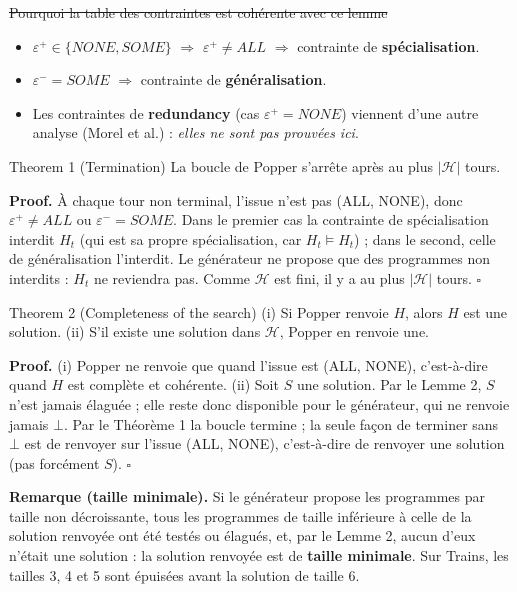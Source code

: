 \documentclass[10pt]{article}
\begin{document}
\st{Pourquoi la table des contraintes est cohérente avec ce lemme}
\begin{itemize}
  \item $\varepsilon^+\in\{\mathit{NONE},\mathit{SOME}\}$ $\Rightarrow$ $\varepsilon^+\neq\mathit{ALL}$ $\Rightarrow$ contrainte de \textbf{spécialisation}.
  \item $\varepsilon^-=\mathit{SOME}$ $\Rightarrow$ contrainte de \textbf{généralisation}.
  \item Les contraintes de \textbf{redundancy} (cas $\varepsilon^+=\mathit{NONE}$) viennent d'une autre analyse (Morel et al.) : \emph{elles ne sont pas prouvées ici}.
\end{itemize}

\begin{enonce}{Theorem 1 (Termination)}
La boucle de Popper s'arrête après au plus $|\mathcal{H}|$ tours.
\end{enonce}
\textbf{Proof.} À chaque tour non terminal, l'issue n'est pas (ALL, NONE), donc $\varepsilon^+\neq\mathit{ALL}$ ou $\varepsilon^-=\mathit{SOME}$. Dans le premier cas la contrainte de spécialisation interdit $H_t$ (qui est sa propre spécialisation, car $H_t\models H_t$) ; dans le second, celle de généralisation l'interdit. Le générateur ne propose que des programmes non interdits : $H_t$ ne reviendra pas. Comme $\mathcal{H}$ est fini, il y a au plus $|\mathcal{H}|$ tours. \hfill $\square$

\begin{enonce}{Theorem 2 (Completeness of the search)}
(i) Si Popper renvoie $H$, alors $H$ est une solution. (ii) S'il existe une solution dans $\mathcal{H}$, Popper en renvoie une.
\end{enonce}
\textbf{Proof.} (i) Popper ne renvoie que quand l'issue est (ALL, NONE), c'est-à-dire quand $H$ est complète et cohérente.
(ii) Soit $S$ une solution. Par le Lemme 2, $S$ n'est jamais élaguée ; elle reste donc disponible pour le générateur, qui ne renvoie jamais $\bot$. Par le Théorème 1 la boucle termine ; la seule façon de terminer sans $\bot$ est de renvoyer sur l'issue (ALL, NONE), c'est-à-dire de renvoyer une solution (pas forcément $S$). \hfill $\square$

\begin{moi}
\textbf{Remarque (taille minimale).} Si le générateur propose les programmes par taille non décroissante, tous les programmes de taille inférieure à celle de la solution renvoyée ont été testés ou élagués, et, par le Lemme 2, aucun d'eux n'était une solution : la solution renvoyée est de \textbf{taille minimale}. Sur Trains, les tailles 3, 4 et 5 sont épuisées avant la solution de taille 6.
\end{moi}
\end{document}
